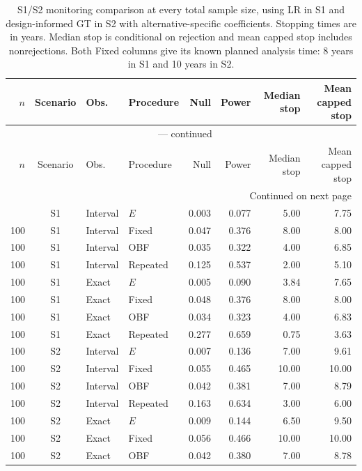 \documentclass[12pt]{article}
\theoremstyle{definition}
\theoremstyle{remark}
\begin{document}
\begingroup
\scriptsize
\setlength{\tabcolsep}{3pt}
\renewcommand{\arraystretch}{1.10}
\setlength{\LTcapwidth}{\textwidth}
\begin{longtable}{rcllrrrr}
\caption{S1/S2 monitoring comparison at every total sample size, using LR in S1 and design-informed GT in S2 with alternative-specific coefficients. Stopping times are in years. Median stop is conditional on rejection and mean capped stop includes nonrejections. Both Fixed columns give its known planned analysis time: 8 years in S1 and 10 years in S2.}\label{tab:primary-performance}\\
\toprule
$n$ & Scenario & Obs. & Procedure & Null & Power & Median stop & Mean capped stop \\
\midrule
\endfirsthead
\multicolumn{8}{c}{\tablename\ \thetable{} --- continued}\\
\toprule
$n$ & Scenario & Obs. & Procedure & Null & Power & Median stop & Mean capped stop \\
\midrule
\endhead
\midrule
\multicolumn{8}{r}{Continued on next page}\\
\endfoot
\bottomrule
\endlastfoot
100 & S1 & Interval & $E$ & 0.003 & 0.077 & 5.00 & 7.75 \\
100 & S1 & Interval & Fixed & 0.047 & 0.376 & 8.00 & 8.00 \\
100 & S1 & Interval & OBF & 0.035 & 0.322 & 4.00 & 6.85 \\
100 & S1 & Interval & Repeated & 0.125 & 0.537 & 2.00 & 5.10 \\
100 & S1 & Exact & $E$ & 0.005 & 0.090 & 3.84 & 7.65 \\
100 & S1 & Exact & Fixed & 0.048 & 0.376 & 8.00 & 8.00 \\
100 & S1 & Exact & OBF & 0.034 & 0.323 & 4.00 & 6.83 \\
100 & S1 & Exact & Repeated & 0.277 & 0.659 & 0.75 & 3.63 \\
100 & S2 & Interval & $E$ & 0.007 & 0.136 & 7.00 & 9.61 \\
100 & S2 & Interval & Fixed & 0.055 & 0.465 & 10.00 & 10.00 \\
100 & S2 & Interval & OBF & 0.042 & 0.381 & 7.00 & 8.79 \\
100 & S2 & Interval & Repeated & 0.163 & 0.634 & 3.00 & 6.00 \\
100 & S2 & Exact & $E$ & 0.009 & 0.144 & 6.50 & 9.50 \\
100 & S2 & Exact & Fixed & 0.056 & 0.466 & 10.00 & 10.00 \\
100 & S2 & Exact & OBF & 0.042 & 0.380 & 7.00 & 8.78 \\

\end{longtable}
\end{document}
